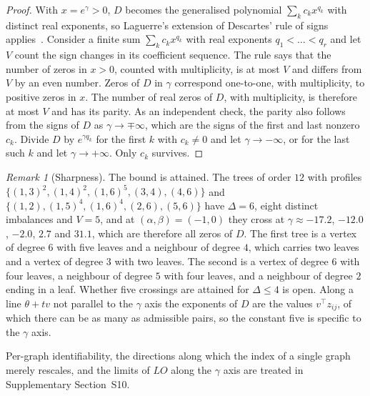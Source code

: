 \documentclass[a5paper, 10pt]{article}
\theoremstyle{plain}
\theoremstyle{remark}
\newtheorem*{remark}{Remark}
\theoremstyle{definition}
\begin{document}
  \begin{proof}
  With $x = e^{\gamma} > 0$, $D$ becomes the generalised polynomial
  $\sum_k c_k x^{q_k}$ with distinct real exponents, so Laguerre's
  extension of Descartes' rule of signs applies~\cite{Jameson2006}.
  Consider a finite sum $\sum_k c_k x^{q_k}$ with real exponents
  $q_1 < \dots < q_r$ and let $V$ count the sign changes in its
  coefficient sequence. The rule says that the number of zeros in
  $x > 0$, counted with multiplicity, is at most $V$ and differs from
  $V$ by an even number. Zeros of
  $D$ in $\gamma$ correspond one-to-one, with multiplicity, to positive
  zeros in $x$. The
  number of real zeros of $D$, with multiplicity, is therefore at most $V$ and has
  its parity. As an independent check, the parity also follows from the signs of $D$
  as $\gamma \to \mp\infty$, which are the signs of the first and last nonzero $c_k$.
  Divide $D$ by $e^{\gamma q_k}$ for the first $k$ with $c_k \neq 0$ and
  let $\gamma \to -\infty$, or for the last such $k$ and let
  $\gamma \to +\infty$. Only $c_k$ survives.
  \end{proof}

  \begin{remark}[Sharpness]\label{rem:crossings}
  The bound is attained. The trees of order $12$ with profiles
  $\{(1,3)^{2},\allowbreak (1,4)^{2},\allowbreak (1,6)^{5},\allowbreak (3,4),\allowbreak (4,6)\}$
  and
  $\{(1,2),\allowbreak (1,5)^{4},\allowbreak (1,6)^{4},\allowbreak (2,6),\allowbreak (5,6)\}$
  have $\Delta = 6$, eight distinct imbalances and $V = 5$, and at
  $(\alpha,\beta) = (-1,0)$ they cross at $\gamma \approx -17.2$,
  $-12.0$, $-2.0$, $2.7$ and $31.1$, which are therefore all zeros of
  $D$. The first tree is a vertex of degree $6$ with five leaves and a
  neighbour of degree $4$, which carries two leaves and a vertex of
  degree $3$ with two leaves. The second is a vertex of degree $6$ with
  four leaves, a neighbour of degree $5$ with four leaves, and a
  neighbour of degree $2$ ending in a leaf. Whether five crossings are
  attained for $\Delta \le 4$ is open. Along a line
  $\theta + t v$ not parallel to the $\gamma$ axis the exponents of $D$
  are the values $v^{\top} z_{ij}$, of which there can be as many as
  admissible pairs, so the constant five is specific to the $\gamma$
  axis.
  \end{remark}

  Per-graph identifiability, the directions along which the index of a
  single graph merely rescales, and the limits of $LO$ along the
  $\gamma$ axis are treated in Supplementary Section~S10.
\end{document}
